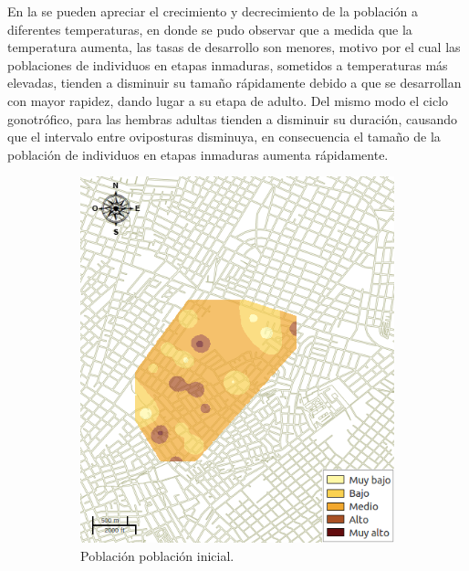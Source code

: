 En la  se pueden apreciar el crecimiento y decrecimiento de la población
a diferentes temperaturas, en donde se pudo observar que a medida que la temperatura aumenta, las
tasas de desarrollo son menores, motivo por el cual las poblaciones de individuos en etapas
inmaduras, sometidos a temperaturas más elevadas, tienden a disminuir su tamaño rápidamente debido
a que se desarrollan con mayor rapidez, dando lugar a su etapa de adulto. Del mismo modo el ciclo
gonotrófico, para las hembras adultas tienden a disminuir su duración, causando que el intervalo
entre oviposturas disminuya, en consecuencia el tamaño de la población de individuos en etapas
inmaduras aumenta rápidamente.

\begin{figure}[!t]
    \centering
    \begin{subfigure}[b]{0.225\textwidth}
        \includegraphics[width=\textwidth]{../book/capitulo-6/graphics/raster/temp-24-0.png}
        \caption{\label{fig:poblacion-mapas-a}Población población inicial.}
    \end{subfigure}
    ~~~~
    \begin{subfigure}[b]{0.225\textwidth}

\end{subfigure}
\end{figure}
